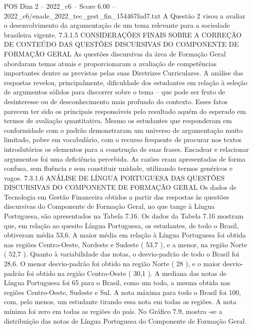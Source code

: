 \begin{textsample}{POS Dim 2 – 2022\_c6 – Score 6.00 – 2022\_c6/enade\_2022\_tec\_gest\_fin\_154467fad7.txt}
A Questão 2 visou a avaliar o desenvolvimento da argumentação de um tema relevante para a sociedade brasileira vigente. 7.3.1.5 CONSIDERAÇÕES FINAIS SOBRE A CORREÇÃO DE CONTEÚDO DAS QUESTÕES DISCURSIVAS DO COMPONENTE DE FORMAÇÃO GERAL As questões discursivas da área de Formação Geral abordaram temas atuais e proporcionaram a avaliação de competências importantes dentre as previstas pelas suas Diretrizes Curriculares.
A análise das respostas revelou, principalmente, dificuldade dos estudantes em relação à seleção de argumentos sólidos para discorrer sobre o tema – que pode ser fruto de desinteresse ou de desconhecimento mais profundo do contexto.
Esses fatos parecem ter sido os principais responsáveis pelo resultado aquém do esperado em termos de avaliação quantitativa.
Mesmo os estudantes que responderam em conformidade com o padrão demonstraram um universo de argumentação muito limitado, pobre em vocabulário, com o recurso frequente de procurar nos textos introdutórios os elementos para a construção de suas frases.
Encadear e relacionar argumentos foi uma deficiência percebida.
As razões eram apresentadas de forma confusa, sem fluência e sem constituir unidade, utilizando termos genéricos e vagos. 7.3.1.6 ANÁLISE DE LÍNGUA PORTUGUESA DAS QUESTÕES DISCURSIVAS DO COMPONENTE DE FORMAÇÃO GERAL Os dados de Tecnologia em Gestão Financeira obtidos a partir das respostas às questões discursivas do Componente de Formação Geral, no que tange à Língua Portuguesa, são apresentados na Tabela 7.16.
Os dados da Tabela 7.16 mostram que, em relação ao quesito Língua Portuguesa, os estudantes, de todo o Brasil, obtiveram média 53,6.
A maior média em relação à Língua Portuguesa foi obtida nas regiões Centro-Oeste, Nordeste e Sudeste ( 53,7 ), e a menor, na região Norte ( 52,7 ).
Quanto à variabilidade das notas, o desvio-padrão de todo o Brasil foi 28,6.
O menor desvio-padrão foi obtido na região Norte ( 28 ), e o maior desvio-padrão foi obtido na região Centro-Oeste ( 30,1 ).
A mediana das notas de Língua Portuguesa foi 65 para o Brasil, como um todo, a mesma obtida nas regiões Centro-Oeste, Sudeste e Sul.
A nota máxima para todo o Brasil foi 100, com, pelo menos, um estudante tirando essa nota em todas as regiões.
A nota mínima foi zero em todas as regiões do país.
No Gráfico 7.9, mostra -se a distribuição das notas de Língua Portuguesa do Componente de Formação Geral.

\end{textsample}
